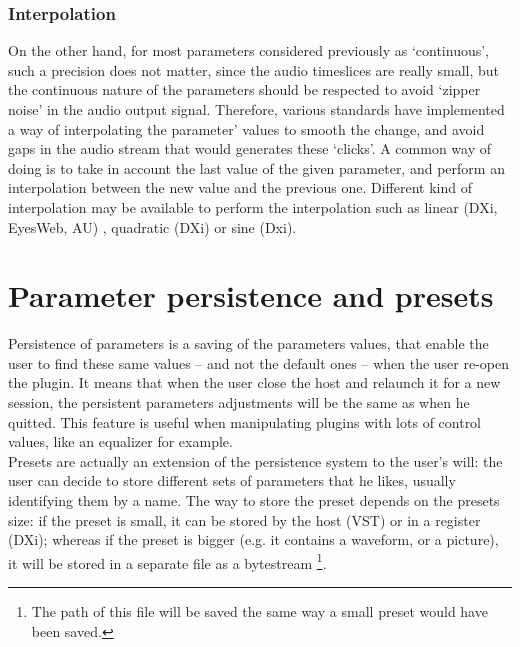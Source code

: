 \subsubsection{Interpolation}
\noindent On the other hand, for most parameters considered previously as `continuous', such a precision does not matter, since the audio timeslices are really small, but the continuous nature of the parameters should be respected to avoid `zipper noise' in the audio output signal. Therefore, various standards have implemented a way of interpolating the parameter' values to smooth the change, and avoid gaps in the audio stream that would generates these `clicks'. A common way of doing is to take in account the last value of the given parameter, and perform an interpolation between the new value and the previous one. Different kind of interpolation may be available to perform the interpolation such as linear (DXi, EyesWeb, AU) , quadratic (DXi) or sine (Dxi).\\




\section{Parameter persistence and presets}
\noindent Persistence of parameters is a saving of the parameters values, that enable the user to find these same values -- and not the default ones -- when the user re-open the plugin. It means that when the user close the host and relaunch it for a new session, the persistent parameters adjustments will be the same as when he quitted. This feature is useful when manipulating plugins with lots of control values, like an equalizer for example.\\
Presets are actually an extension of the persistence system to the user's will: the user can decide to store different sets of parameters that he likes, usually identifying them by a name. The way to store the preset depends on the presets size: if the preset is small, it can be stored by the host (VST) or in a register (DXi); whereas if the preset is bigger (e.g. it contains a waveform, or a picture), it will be stored in a separate file as a bytestream \footnote{The path of this file will be saved the same way a small preset would have been saved.}.\\


